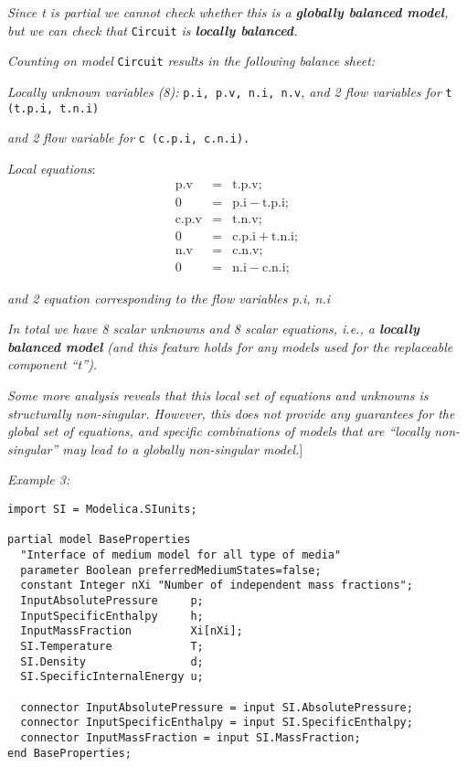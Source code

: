 \emph{Since t is partial we cannot check whether this is a
\textbf{globally balanced model}, but we can check that} \lstinline!Circuit!
\emph{is \textbf{locally balanced}.}

\emph{Counting on model} \lstinline!Circuit! \emph{results in the following balance
sheet:}

\emph{Locally unknown variables (8):} \lstinline!p.i, p.v, n.i, n.v!\emph{, and 2
flow variables for} \lstinline!t (t.p.i, t.n.i)!

\emph{and 2 flow variable for} \lstinline!c (c.p.i, c.n.i).!

\emph{Local equations}: 
\begin{eqnarray*} \text{p.v} &=& \text{t.p.v};\\
0 &=& \text{p.i}-\text{t.p.i};\\
\text{c.p.v} &=& \text{t.n.v};\\
0 &=& \text{c.p.i}+\text{t.n.i};\\
\text{n.v} &=& \text{c.n.v};\\
0 &=& \text{n.i}-\text{c.n.i};
\end{eqnarray*}

\emph{and 2 equation corresponding to the flow variables p.i, n.i}

\emph{In total we have 8 scalar unknowns and 8 scalar equations, i.e., a
\textbf{locally} \textbf{balanced model} (and this feature holds for any
models used for the replaceable component ``t''). }

\emph{Some more analysis reveals that this local set of equations and
unknowns is structurally non-singular. However, this does not provide
any guarantees for the global set of equations, and specific
combinations of models that are ``locally non-singular'' may lead to a
globally non-singular model.}{]}

\emph{Example 3:}
\begin{lstlisting}[language=modelica]
import SI = Modelica.SIunits;

partial model BaseProperties
  "Interface of medium model for all type of media"
  parameter Boolean preferredMediumStates=false;
  constant Integer nXi "Number of independent mass fractions";
  InputAbsolutePressure     p;
  InputSpecificEnthalpy     h;
  InputMassFraction         Xi[nXi];
  SI.Temperature            T;
  SI.Density                d;
  SI.SpecificInternalEnergy u;
  
  connector InputAbsolutePressure = input SI.AbsolutePressure;
  connector InputSpecificEnthalpy = input SI.SpecificEnthalpy;
  connector InputMassFraction = input SI.MassFraction;
end BaseProperties;
\end{lstlisting}

